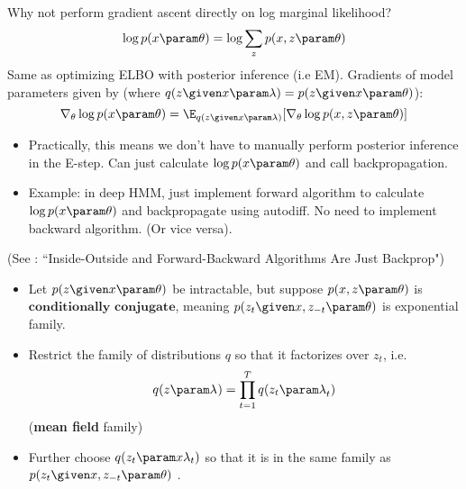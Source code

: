 \begin{frame}
Why not perform gradient ascent directly on log marginal likelihood?
\[ \log p( x \param\theta) = \log \sum_{z} p (x , z \param \theta)\]
\pause
Same as optimizing ELBO with posterior inference (i.e EM). Gradients of model parameters given by (where $q(z \given x \param \lambda) = p(z \given x \param \theta)$):
    \[   \nabla_\theta \log p(x \param \theta)  = \E_{q(z \given x \param \lambda)} [\nabla_\theta \log p(x, z \param \theta)] \] 
\begin{center}
\end{center}
 \end{frame}


\begin{frame}
\begin{itemize}
    \item Practically, this means we don't have to manually perform posterior inference in the E-step. Can just calculate $\log p(x \param \theta)$ and call backpropagation.
    \item Example: in deep HMM, just implement forward  algorithm to calculate $\log p(x \param \theta)$ and backpropagate using autodiff. No need to implement backward algorithm. (Or vice versa).
\end{itemize}
    \vspace{2mm}
    (See \cite{eisner2016}:  ``Inside-Outside and Forward-Backward Algorithms Are Just Backprop")
\end{frame}

\begin{frame}

\begin{itemize}
    \item Let $p(z \given x \param \theta)$ be intractable, but suppose $p(x, z \param \theta)$
is $\textbf{conditionally conjugate}$, meaning $p(z_t \given x, z_{-t} \param \theta)$ is exponential family.
    \item Restrict the family of distributions $q$ so that it factorizes over $z_t$, i.e.\[ q(z \param \lambda^{}) = \prod_{t=1}^T q(z_t \param \lambda_{t}^{})\] (\textbf{mean field} family)
    \item Further choose $q(z_t \param x\lambda_{t}) $ so that it is
    in the same family as 
$p(z_t \given x, z_{-t} \param \theta)$ .

\end{itemize}

\end{frame}

